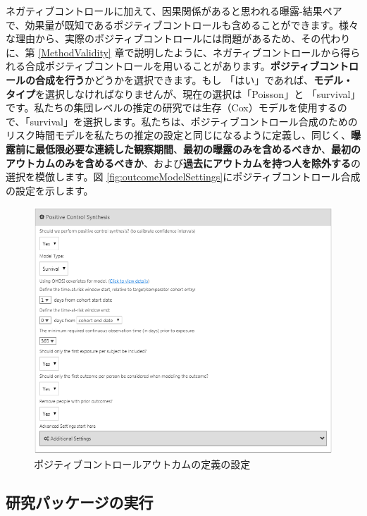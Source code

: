 \documentclass[
  11pt]{book}
\theoremstyle{definition}
\theoremstyle{definition}
\theoremstyle{definition}
\theoremstyle{definition}
\theoremstyle{remark}
\begin{document}
ネガティブコントロールに加えて、因果関係があると思われる曝露-結果ペアで、効果量が既知であるポジティブコントロールも含めることができます。様々な理由から、実際のポジティブコントロールには問題があるため、その代わりに、第 \ref{MethodValidity} 章で説明したように、ネガティブコントロールから得られる合成ポジティブコントロールを用いることがあります。\textbf{ポジティブコントロールの合成を行う}かどうかを選択できます。もし 「はい」であれば、\textbf{モデル・タイプ}を選択しなければなりませんが、現在の選択は「Poisson」と 「survival」です。私たちの集団レベルの推定の研究では生存（Cox）モデルを使用するので、「survival」を選択します。私たちは、ポジティブコントロール合成のためのリスク時間モデルを私たちの推定の設定と同じになるように定義し、同じく、\textbf{曝露前に最低限必要な連続した観察期間}、\textbf{最初の曝露のみを含めるべきか}、\textbf{最初のアウトカムのみを含めるべきか}、および\textbf{過去にアウトカムを持つ人を除外する}の選択を模倣します。図 \ref{fig:outcomeModelSettings}にポジティブコントロール合成の設定を示します。

\begin{figure}

{\centering \includegraphics[width=1\linewidth]{images/PopulationLevelEstimation/pcSynthesis} 

}

\caption{ポジティブコントロールアウトカムの定義の設定}\label{fig:pcSynthesis}
\end{figure}

\subsection{研究パッケージの実行}\label{ux7814ux7a76ux30d1ux30c3ux30b1ux30fcux30b8ux306eux5b9fux884c}
\end{document}
